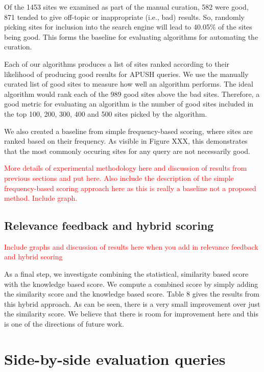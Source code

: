 \documentclass[pdfpagelabels=false,plainpages=true]{acm_proc_article-sp}
\begin{document}
Of the 1453 sites we examined as part of the manual curation, 582 were good, 871
tended to give off-topic or inappropriate (i.e., bad) results. So, randomly
picking sites for inclusion into the search engine will lead to 40.05\% of the
sites being good. This forms the baseline for evaluating algorithms for
automating the curation. 

Each of our algorithms produces a list of sites ranked according to their
likelihood of producing good results for APUSH queries. We use the manually
curated list of good sites to measure how well an algorithm performs. The ideal
algorithm would rank each of the 989 good sites above the bad sites. Therefore,
a good metric for evaluating an algorithm is the number of good sites included
in the top 100, 200, 300, 400 and 500 sites picked by the algorithm. 

We also created a baseline from simple frequency-based scoring, where
sites are ranked based on their frequency. As visible in Figure XXX, this demonstrates that the
most commonly occuring sites for any query are not necessarily good. 

\textcolor{red}{More details of experimental methodology here and discussion
  of results from previous sections and put here. Also include the description
  of the simple frequency-based scoring approach here as this is really a baseline
  not a proposed method. Include graph.}  

\subsection{Relevance feedback and hybrid scoring}

\textcolor{red}{Include graphs and discussion of results here when you add in
  relevance feedback and hybrid scoring}

As a final step, we investigate combining the statistical, similarity based
score with the knowledge based score. We compute a combined score by simply
adding the similarity score and the knowledge based score. Table 8 gives the
results from this hybrid approach. As can be seen, there is a very small
improvement over just the similarity score. We believe that there is room for
improvement here and this is one of the directions of future work. 




\appendix
\section{Side-by-side evaluation queries}
\label{app-queries}
\end{document}
